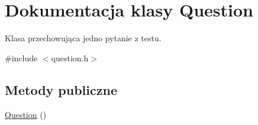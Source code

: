 \hypertarget{classQuestion}{\section{\-Dokumentacja klasy \-Question}
\label{classQuestion}
}


\-Klasa przechowująca jedno pytanie z testu.  




{\ttfamily \#include $<$question.\-h$>$}

\subsection*{\-Metody publiczne}
\begin{DoxyCompactItemize}
\item 
\hypertarget{classQuestion_a2e1167d0407c7530b4f7a7492d0050d0}{\hyperlink{classQuestion_a2e1167d0407c7530b4f7a7492d0050d0}{\-Question} ()}\label{classQuestion_a2e1167d0407c7530b4f7a7492d0050d0}


\end{DoxyCompactItemize}
